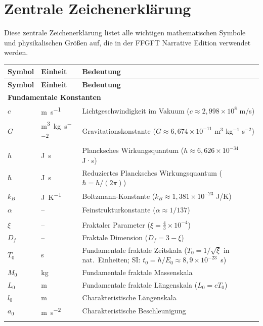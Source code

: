 
\chapter*{Zentrale Zeichenerklärung}

Diese zentrale Zeichenerklärung listet alle wichtigen mathematischen Symbole und physikalischen Größen auf, die in der FFGFT Narrative Edition verwendet werden.

\begin{longtable}{@{}p{}p{}p{}@{}}
  \toprule
  \textbf{Symbol} & \textbf{Einheit} & \textbf{Bedeutung} \\
  \midrule
  \endfirsthead
  
  \toprule
  \textbf{Symbol} & \textbf{Einheit} & \textbf{Bedeutung} \\
  \midrule
  \endhead
  
  \multicolumn{3}{l}{\textbf{Fundamentale Konstanten}} \\
  \midrule
  $c$ & \si{\meter\per\second} & Lichtgeschwindigkeit im Vakuum ($c \approx 2{,}998 \times 10^8$ m/s) \\
  $G$ & \si{\meter\cubed\per\kilo\gram\per\second\squared} & Gravitationskonstante ($G \approx 6{,}674 \times 10^{-11}$ m$^3$ kg$^{-1}$ s$^{-2}$) \\
  $h$ & \si{\joule\second} & Plancksches Wirkungsquantum ($h \approx 6{,}626 \times 10^{-34}$ J·s) \\
  $\hbar$ & \si{\joule\second} & Reduziertes Plancksches Wirkungsquantum ($\hbar = h/(2\pi)$) \\
  $k_B$ & \si{\joule\per\kelvin} & Boltzmann-Konstante ($k_B \approx 1{,}381 \times 10^{-23}$ J/K) \\
  $\alpha$ & -- & Feinstrukturkonstante ($\alpha \approx 1/137$) \\
  \addlinespace
  
  \multicolumn{3}{l}{\textbf{FFGFT-spezifische Größen}} \\
  \midrule
  $\xi$ & -- & Fraktaler Parameter ($\xi = \frac{4}{3} \times 10^{-4}$) \\
  $D_f$ & -- & Fraktale Dimension ($D_f = 3 - \xi$) \\
  $T_0$ & \si{\second} & Fundamentale fraktale Zeitskala ($T_0 = 1/\sqrt{\xi}$ in nat.\ Einheiten; SI: $t_0 = \hbar/E_0 \approx 8{,}9 \times 10^{-23}$~s) \\
  $M_0$ & \si{\kilo\gram} & Fundamentale fraktale Massenskala \\
  $L_0$ & \si{\meter} & Fundamentale fraktale Längenskala ($L_0 = c T_0$) \\
  $l_0$ & \si{\meter} & Charakteristische Längenskala \\
  $a_0$ & \si{\meter\per\second\squared} & Charakteristische Beschleunigung \\
  \addlinespace
  

\end{longtable}
